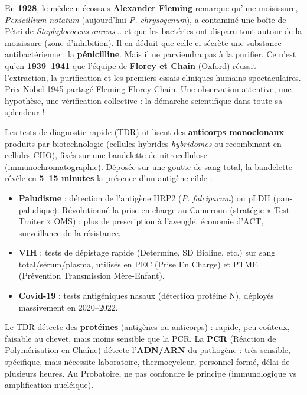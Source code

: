 \documentclass[11pt]{article}
\newcommand{\cle}[1]{{\popxbold\color{popdark}#1}}
\newcounter{popsec}
\newcounter{popsub}
\newcommand{\courssub}[1]{%
  \stepcounter{popsub}%
  \par\vspace{9pt}\noindent{\popxbold\fontsize{11.5}{13}\selectfont\color{popink}{\color{poporange}\thepopsec.\thepopsub}\hspace{6pt}#1}\par\nopagebreak\vspace{4pt}
}
\begin{document}
\begin{savaistu}
En \textbf{1928}, le médecin écossais \textbf{Alexander Fleming} remarque qu'une moisissure, \emph{Penicillium notatum} (aujourd'hui \emph{P. chrysogenum}), a contaminé une boîte de Pétri de \emph{Staphylococcus aureus}... et que les bactéries ont disparu tout autour de la moisissure (zone d'inhibition). Il en déduit que celle-ci sécrète une substance antibactérienne : la \textbf{pénicilline}. Mais il ne parviendra pas à la purifier. Ce n'est qu'en \textbf{1939--1941} que l'équipe de \textbf{Florey et Chain} (Oxford) réussit l'extraction, la purification et les premiers essais cliniques humains spectaculaires. Prix Nobel 1945 partagé Fleming-Florey-Chain. Une observation attentive, une hypothèse, une vérification collective : la démarche scientifique dans toute sa splendeur !
\end{savaistu}

\courssub{Tests de diagnostic rapide (TDR)}

Les \cle{tests de diagnostic rapide} (TDR) utilisent des \textbf{anticorps monoclonaux} produits par biotechnologie (cellules hybrides \emph{hybridomes} ou recombinant en cellules CHO), fixés sur une bandelette de nitrocellulose (immunochromatographie). Déposée sur une goutte de sang total, la bandelette révèle en \textbf{5--15 minutes} la présence d'un antigène cible :
\begin{itemize}
\item \textbf{Paludisme} : détection de l'antigène HRP2 (\emph{P. falciparum}) ou pLDH (pan-paludique). Révolutionné la prise en charge au Cameroun (stratégie « Test-Traiter » OMS) : plus de prescription à l'aveugle, économie d'ACT, surveillance de la résistance.
\item \textbf{VIH} : tests de dépistage rapide (Determine, SD Bioline, etc.) sur sang total/sérum/plasma, utilisés en PEC (Prise En Charge) et PTME (Prévention Transmission Mère-Enfant).
\item \textbf{Covid-19} : tests antigéniques nasaux (détection protéine N), déployés massivement en 2020--2022.
\end{itemize}
\begin{attention}
Le TDR détecte des \textbf{protéines} (antigènes ou anticorps) : rapide, peu coûteux, faisable au chevet, mais moins sensible que la PCR. La \textbf{PCR} (Réaction de Polymérisation en Chaîne) détecte l'\textbf{ADN/ARN} du pathogène : très sensible, spécifique, mais nécessite laboratoire, thermocycleur, personnel formé, délai de plusieurs heures. Au Probatoire, ne pas confondre le principe (immunologique vs amplification nucléique).
\end{attention}
\end{document}
